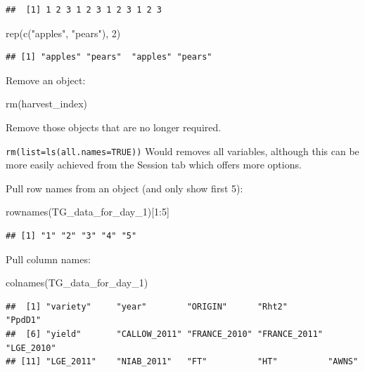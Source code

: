 \documentclass[
]{book}
\newenvironment{Shaded}{\begin{snugshade}}{\end{snugshade}}
\newcommand{\DecValTok}[1]{\textcolor[rgb]{0.00,0.00,0.81}{#1}}
\newcommand{\FunctionTok}[1]{\textcolor[rgb]{0.00,0.00,0.00}{#1}}
\newcommand{\NormalTok}[1]{#1}
\newcommand{\SpecialCharTok}[1]{\textcolor[rgb]{0.00,0.00,0.00}{#1}}
\newcommand{\StringTok}[1]{\textcolor[rgb]{0.31,0.60,0.02}{#1}}
\begin{document}
\begin{verbatim}
##  [1] 1 2 3 1 2 3 1 2 3 1 2 3
\end{verbatim}

\begin{Shaded}
\begin{Highlighting}[]
\FunctionTok{rep}\NormalTok{(}\FunctionTok{c}\NormalTok{(}\StringTok{"apples"}\NormalTok{, }\StringTok{"pears"}\NormalTok{), }\DecValTok{2}\NormalTok{)}
\end{Highlighting}
\end{Shaded}

\begin{verbatim}
## [1] "apples" "pears"  "apples" "pears"
\end{verbatim}

Remove an object:

\begin{Shaded}
\begin{Highlighting}[]
\FunctionTok{rm}\NormalTok{(harvest\_index)}
\end{Highlighting}
\end{Shaded}

Remove those objects that are no longer required.

\texttt{rm(list=ls(all.names=TRUE))} Would removes all variables, although this can be more easily achieved from the Session tab which offers more options.

Pull row names from an object (and only show first 5):

\begin{Shaded}
\begin{Highlighting}[]
\FunctionTok{rownames}\NormalTok{(TG\_data\_for\_day\_1)[}\DecValTok{1}\SpecialCharTok{:}\DecValTok{5}\NormalTok{]}
\end{Highlighting}
\end{Shaded}

\begin{verbatim}
## [1] "1" "2" "3" "4" "5"
\end{verbatim}

Pull column names:

\begin{Shaded}
\begin{Highlighting}[]
\FunctionTok{colnames}\NormalTok{(TG\_data\_for\_day\_1)}
\end{Highlighting}
\end{Shaded}

\begin{verbatim}
##  [1] "variety"     "year"        "ORIGIN"      "Rht2"        "PpdD1"      
##  [6] "yield"       "CALLOW_2011" "FRANCE_2010" "FRANCE_2011" "LGE_2010"   
## [11] "LGE_2011"    "NIAB_2011"   "FT"          "HT"          "AWNS"
\end{verbatim}
\end{document}
